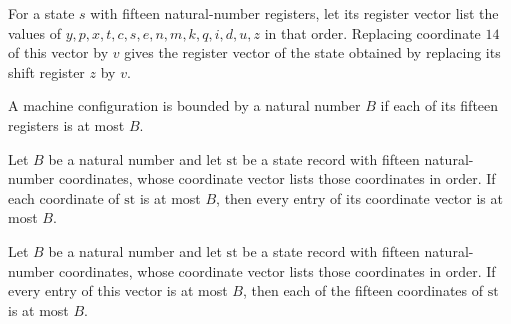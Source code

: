 \begin{lemma}
\label{Complexity.PathHard.St.upd_z}
\leanok
{}
For a state $s$ with fifteen natural-number registers, let its register vector list the
values of $y,p,x,t,c,s,e,n,m,k,q,i,d,u,z$ in that order. Replacing coordinate $14$ of
this vector by $v$ gives the register vector of the state obtained by replacing its
shift register $z$ by $v$.
\end{lemma}

\begin{definition}
\label{Complexity.PathHard.St.Bd}
\leanok
{}
A machine configuration is bounded by a natural number $B$ if each of its fifteen
registers is at most $B$.
\end{definition}

\begin{lemma}
\label{Complexity.PathHard.St.Bd.toV}
\leanok
{}
Let $B$ be a natural number and let $\mathrm{st}$ be a state record with fifteen
natural-number coordinates, whose coordinate vector lists those coordinates in order. If
each coordinate of $\mathrm{st}$ is at most $B$, then every entry of its coordinate
vector is at most $B$.
\end{lemma}

\begin{lemma}
\label{Complexity.PathHard.St.Bd.of_toV}
\leanok
{}
Let $B$ be a natural number and let $\mathrm{st}$ be a state record with fifteen
natural-number coordinates, whose coordinate vector lists those coordinates in order. If
every entry of this vector is at most $B$, then each of the fifteen coordinates of
$\mathrm{st}$ is at most $B$.
\end{lemma}

